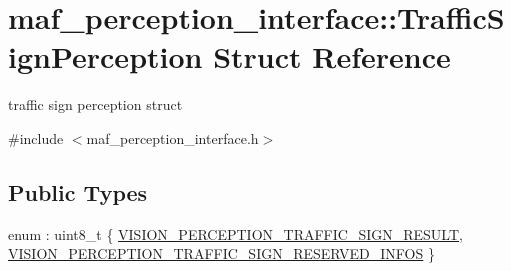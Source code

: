 \hypertarget{structmaf__perception__interface_1_1TrafficSignPerception}{}\section{maf\+\_\+perception\+\_\+interface\+:\+:Traffic\+Sign\+Perception Struct Reference}
\label{structmaf__perception__interface_1_1TrafficSignPerception}


traffic sign perception struct  




{\ttfamily \#include $<$maf\+\_\+perception\+\_\+interface.\+h$>$}

\subsection*{Public Types}
\begin{DoxyCompactItemize}
\item 
enum \+: uint8\+\_\+t \{ \hyperlink{structmaf__perception__interface_1_1TrafficSignPerception_a4238a6b8a0f7547a267c7a3ac8438d42a2d150431e0655d8a0e83c03e00d926ff}{V\+I\+S\+I\+O\+N\+\_\+\+P\+E\+R\+C\+E\+P\+T\+I\+O\+N\+\_\+\+T\+R\+A\+F\+F\+I\+C\+\_\+\+S\+I\+G\+N\+\_\+\+R\+E\+S\+U\+LT}, 
\hyperlink{structmaf__perception__interface_1_1TrafficSignPerception_a4238a6b8a0f7547a267c7a3ac8438d42a3748d1e14f2b9c64df222a2e275878a6}{V\+I\+S\+I\+O\+N\+\_\+\+P\+E\+R\+C\+E\+P\+T\+I\+O\+N\+\_\+\+T\+R\+A\+F\+F\+I\+C\+\_\+\+S\+I\+G\+N\+\_\+\+R\+E\+S\+E\+R\+V\+E\+D\+\_\+\+I\+N\+F\+OS}
 \}
\end{DoxyCompactItemize}
